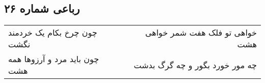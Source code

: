 \begin{center}
\section*{رباعی شماره ۲۶}
\label{sec:sh026}
\begin{longtable}{l p{0.5cm} r}
چون چرخ بکام یک خردمند نگشت
&&
خواهی تو فلک هفت شمر خواهی هشت
\\
چون باید مرد و آرزوها همه هشت
&&
چه مور خورد بگور و چه گرگ بدشت
\\
\end{longtable}
\end{center}

